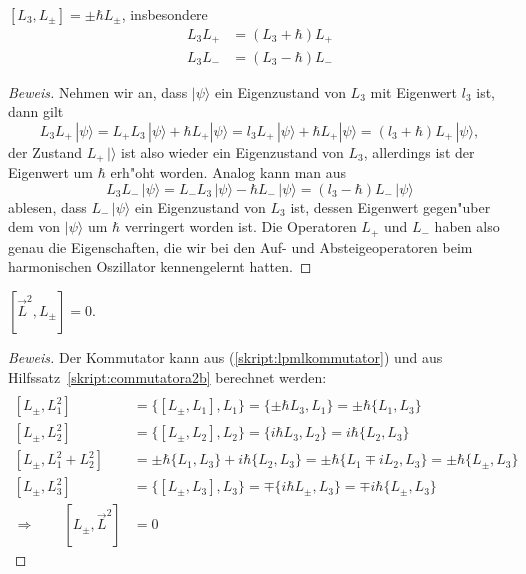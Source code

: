 \begin{hilfssatz}
$[L_3,L_\pm]=\pm\hbar L_{\pm}$, insbesondere 
\begin{align*}
L_3L_+&=(L_3+\hbar)L_+\\
L_3L_-&=(L_3-\hbar)L_-
\end{align*}
\label{skript:laufab}
\end{hilfssatz}

\begin{proof}[Beweis]
Nehmen wir an, dass $|\psi\rangle$ ein Eigenzustand von $L_3$ mit
Eigenwert $l_3$ ist, dann gilt
\[
L_3L_+\,|\psi\rangle
=
L_+L_3\,|\psi\rangle+\hbar L_+|\psi\rangle
=
l_3L_+\,|\psi\rangle+\hbar L_+|\psi\rangle
=
(l_3+\hbar)L_+\,|\psi\rangle,
\]
der Zustand $L_+\,|\rangle$ ist also wieder ein Eigenzustand von $L_3$,
allerdings ist der Eigenwert um $\hbar$ erh"oht worden.
Analog kann man aus
\[
L_3L_-\,|\psi\rangle
=
L_-L_3\,|\psi\rangle-\hbar L_-\,|\psi\rangle
=
(l_3-\hbar)L_-\,|\psi\rangle
\]
ablesen,  dass $L_-\,|\psi\rangle$ ein Eigenzustand von $L_3$ ist, dessen
Eigenwert gegen"uber dem von $|\psi\rangle$ um $\hbar$ verringert
worden ist.
Die Operatoren $L_+$ und $L_-$ haben also genau die Eigenschaften,
die wir bei den Auf- und Absteigeoperatoren beim harmonischen Oszillator
kennengelernt hatten.
\end{proof}

\begin{hilfssatz}
$[\vec L^2,L_\pm]=0.$
\end{hilfssatz}

\begin{proof}[Beweis]
Der Kommutator kann
aus (\ref{skript:lpmlkommutator}) und aus
Hilfssatz~\ref{skript:commutatora2b} berechnet werden:
\begin{align*}
\\
[L_\pm,L_1^2]
&=
\{ [L_\pm, L_1], L_1 \}
=
\{ \pm \hbar L_3, L_1 \}
=
\pm \hbar \{ L_1, L_3 \}
\\
[L_\pm,L_2^2]
&=
\{ [L_\pm, L_2], L_2 \}
=
\{ i\hbar L_3, L_2 \}
=
i\hbar \{ L_2, L_3 \}
\\
[L_\pm,L_1^2 + L_2^2]
&=
\pm \hbar \{ L_1, L_3 \}
+
i\hbar \{ L_2, L_3 \}
=
\pm \hbar \{ L_1 \mp iL_2, L_3 \}
=
\pm \hbar\{L_\pm, L_3\}
\\
[L_\pm,L_3^2]
&=
\{ [L_\pm, L_3], L_3 \}
=
\mp \{ i\hbar L_\pm, L_3 \}
=
\mp i\hbar \{ L_\pm, L_3 \}
\\
\Rightarrow\qquad [L_\pm,\vec L^2]
&=0
\end{align*}
\end{proof}

